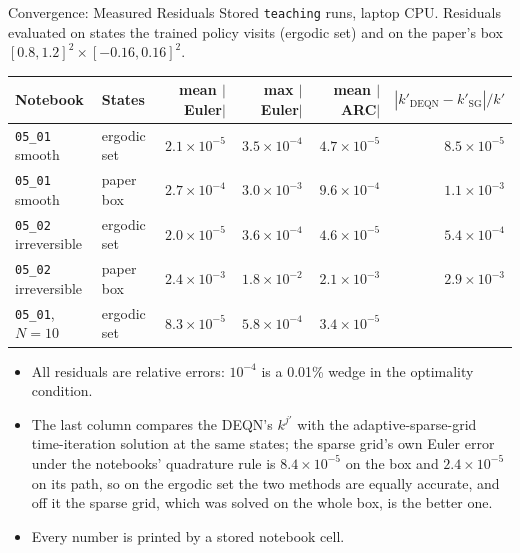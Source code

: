 \documentclass[aspectratio=169,11pt]{beamer}
\newcommand{\emphc}[1]{\textcolor{harvardcrimson}{#1}}
\begin{document}
\begin{frame}{Convergence: Measured Residuals}
\footnotesize
Stored \texttt{teaching} runs, laptop CPU. Residuals evaluated on states the trained policy visits (ergodic set) and on the paper's box $[0.8,1.2]^2 \times [-0.16, 0.16]^2$.

\vspace{0.3em}
\begin{center}
\begin{tabular}{llrrrr}
\toprule
\textbf{Notebook} & \textbf{States} & \textbf{mean $|$Euler$|$} & \textbf{max $|$Euler$|$} & \textbf{mean $|$ARC$|$} & \textbf{$|k'_{\text{DEQN}} - k'_{\text{SG}}|/k'$} \\
\midrule
\texttt{05\_01} smooth & ergodic set & $2.1 \times 10^{-5}$ & $3.5 \times 10^{-4}$ & $4.7 \times 10^{-5}$ & $8.5 \times 10^{-5}$ \\
\texttt{05\_01} smooth & paper box & $2.7 \times 10^{-4}$ & $3.0 \times 10^{-3}$ & $9.6 \times 10^{-4}$ & $1.1 \times 10^{-3}$ \\
\texttt{05\_02} irreversible & ergodic set & $2.0 \times 10^{-5}$ & $3.6 \times 10^{-4}$ & $4.6 \times 10^{-5}$ & $5.4 \times 10^{-4}$ \\
\texttt{05\_02} irreversible & paper box & $2.4 \times 10^{-3}$ & $1.8 \times 10^{-2}$ & $2.1 \times 10^{-3}$ & $2.9 \times 10^{-3}$ \\
\texttt{05\_01}, $N = 10$ & ergodic set & $8.3 \times 10^{-5}$ & $5.8 \times 10^{-4}$ & $3.4 \times 10^{-5}$ & \\
\bottomrule
\end{tabular}
\end{center}

\vspace{0.3em}
\begin{itemize}\itemsep1pt
    \item All residuals are \emphc{relative errors}: $10^{-4}$ is a 0.01\% wedge in the optimality condition.
    \item The last column compares the DEQN's $k^{j\prime}$ with the adaptive-sparse-grid time-iteration solution at the same states; the sparse grid's own Euler error under the notebooks' quadrature rule is $8.4 \times 10^{-5}$ on the box and $2.4 \times 10^{-5}$ on its path, so on the ergodic set the two methods are equally accurate, and off it the sparse grid, which was solved on the whole box, is the better one.
    \item Every number is printed by a stored notebook cell.
\end{itemize}
\end{frame}
\end{document}
